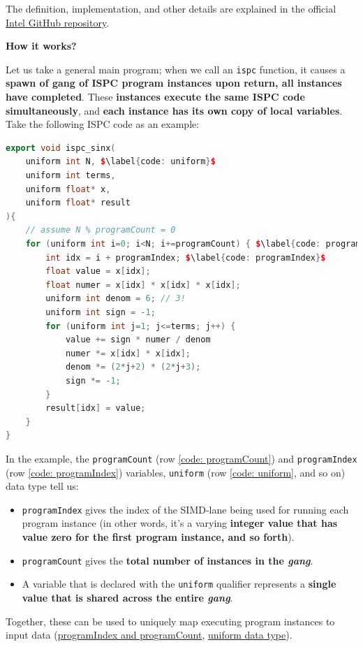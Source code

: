 \noindent
The definition, implementation, and other details are explained in the official \href{https://github.com/ispc/ispc}{Intel GitHub repository}.

\newpage

\begin{flushleft}
    \textcolor{Green3}{ \textbf{How it works?}}
\end{flushleft}
Let us take a general main program; when we call an \texttt{ispc} function, it causes a \textbf{spawn of gang of ISPC program instances upon return, all instances have completed}. These \textbf{instances execute the same ISPC code simultaneously}, and \textbf{each instance has its own copy of local variables}. Take the following ISPC code as an example:
\begin{lstlisting}[language=c++, mathescape]
export void ispc_sinx(
    uniform int N, $\label{code: uniform}$
    uniform int terms,
    uniform float* x,
    uniform float* result
){
    // assume N % programCount = 0
    for (uniform int i=0; i<N; i+=programCount) { $\label{code: programCount}$
        int idx = i + programIndex; $\label{code: programIndex}$
        float value = x[idx];
        float numer = x[idx] * x[idx] * x[idx];
        uniform int denom = 6; // 3!
        uniform int sign = -1;
        for (uniform int j=1; j<=terms; j++) { 
            value += sign * numer / denom
            numer *= x[idx] * x[idx];
            denom *= (2*j+2) * (2*j+3);
            sign *= -1;
        }
        result[idx] = value;
    }
}
\end{lstlisting}
In the example, the \texttt{programCount} (row \ref{code: programCount}) and \texttt{programIndex} (row \ref{code: programIndex}) variables, \texttt{uniform} (row \ref{code: uniform}, and so on) data type tell us:
\begin{itemize}
    \item \texttt{programIndex} gives the index of the SIMD-lane being used for running each program instance (in other words, it's a varying \textbf{integer value that has value zero for the first program instance, and so forth}).
    
    \item \texttt{programCount} gives the \textbf{total number of instances in the \emph{gang}}.
    
    \item A variable that is declared with the \texttt{uniform} qualifier represents a \textbf{single value that is shared across the entire \emph{gang}}. 
\end{itemize}
Together, these can be used to uniquely map executing program instances to input data (\href{https://ispc.github.io/ispc.html#parallel-iteration-with-programindex-and-programcount}{programIndex and programCount}, \href{https://ispc.github.io/ispc.html#uniform-data}{uniform data type}).

